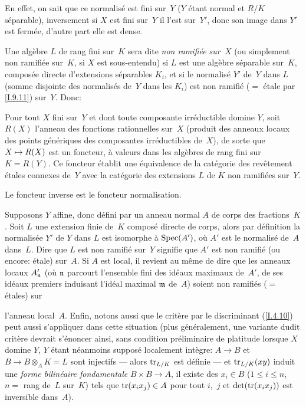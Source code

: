En effet, on sait que ce normalis\'e est fini sur~$Y$ ($Y$ \'etant
normal et $R/K$ s\'eparable), inversement si $X$ est fini sur~$Y$ il
l'est sur~$Y'$, donc son image dans $Y'$ est ferm\'ee, d'autre part
elle est dense.

Une alg\`ebre $L$ de rang fini sur~$K$ sera dite \emph{non
ramifiée sur~$X$} (ou simplement non ramifi\'ee sur~$K$, si $X$
est sous-entendu) si $L$ est une alg\`ebre s\'eparable sur~$K$,
\ie compos\'ee directe d'extensions s\'eparables $K_i$, et si le
normalis\'e $Y'$ de~$Y$ dans $L$ (somme disjointe des normalis\'es
de~$Y$ dans les $K_i$) est non ramifi\'e ($=$ \'etale par \ref{I.9.11})
sur~$Y$. Donc:

\begin{corollaire}
\label{I.10.3}
Pour tout $X$ fini sur~$Y$ et dont toute composante irr\'eductible
domine $Y$, soit $R(X)$ l'anneau des fonctions rationnelles sur~$X$
(produit des anneaux
locaux des points g\'en\'eriques des composantes irr\'eductibles
de~$X$), de sorte que $X\mto R(X)$ est un foncteur, \`a valeurs
dans les alg\`ebres de rang fini sur~$K=R(Y)$. Ce foncteur
\'etablit une \'equivalence de la cat\'egorie des rev\^etement
\'etales connexes de~$Y$ avec la cat\'egorie des extensions $L$ de
$K$ non ramifi\'ees sur~$Y$.
\end{corollaire}

Le foncteur inverse est le foncteur normalisation.

Supposons $Y$ affine, donc d\'efini par un anneau normal $A$ de corps
des fractions~$K$. Soit $L$ une extension finie de~$K$ compos\'e
directe de corps, alors par d\'efinition la normalis\'ee $Y'$ de
$Y$ dans $L$ est isomorphe \`a $\operatorname{Spec}(A')$, o\`u $A'$ est le
normalis\'e de~$A$ dans~$L$. Dire que $L$ est non ramifi\'e sur~$Y$ signifie que $A'$ est non ramifi\'e (ou encore: \'etale)
sur~$A$.
Si
$A$ est local, il revient au m\^eme de dire que les anneaux locaux
$A^\prime_{\mathfrak{n}}$ (o\`u
$\mathfrak{n}$
parcourt l'ensemble fini des id\'eaux maximaux de~$A'$, \ie de ses
id\'eaux premiers induisant l'id\'eal maximal $\mathfrak{m}$ de~$A$)
soient non ramifi\'es ($=$ \'etales) sur

l'anneau local~$A$. Enfin, notons aussi que le crit\`ere par le
discriminant (\ref{I.4.10}) peut aussi s'appliquer dans cette situation (plus
g\'en\'eralement, une variante dudit crit\`ere devrait
s'\'enoncer ainsi, sans condition pr\'eliminaire de platitude
lorsque $X$ domine $Y$, $Y$ \'etant n\'eanmoins suppos\'e
localement int\`egre: $A\to B$ et $B\to B\otimes_A K =L$ sont
injectifs --- alors $\operatorname{tr}_{L/K}$ est d\'efinie --- et
$\operatorname{tr}_{L/K}(xy)$ induit une \emph{forme bilinéaire fondamentale}
$B\times B\to A$, \ie il existe des $x_i\in B$ ($1\le i\le n$, $n=$
rang de~$L$ sur~$K$) tels que $\operatorname{tr}(x_ix_j)\in A$ pour tout $i$,~$j$
et
$\det(\operatorname{tr}(x_ix_j))$
est inversible dans~$A$).

